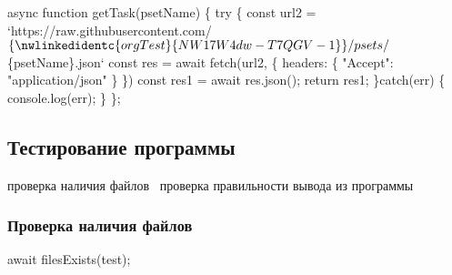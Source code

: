 \nwenddocs{}\endmoddef\nwstartdeflinemarkup{}\nwenddeflinemarkup
async function getTask(psetName)
\{
        try
        \{
        const url2 = `https://raw.githubusercontent.com/$\{\nwlinkedidentc{orgTest}{NW17W4dw-T7QGV-1}\}/psets/$\{psetName\}.json` 
        const res = await fetch(url2, 
        \{ 
                headers: 
                \{ 
                        "Accept": "application/json"
                 \}
        \})
        const res1 = await res.json();
        return res1;
        \}catch(err)
        \{
                console.log(err);
        \}
\};
\nwendcode{}\nwdocspar

\subsection{Тестирование программы}
\nwenddocs{}\endmoddef\nwstartdeflinemarkup{}\nwenddeflinemarkup
        \LA{}проверка наличия файлов~{\nwtagstyle{}}\RA{}
        \LA{}проверка правильности вывода из программы~{\nwtagstyle{}}\RA{}
\nwendcode{}\nwdocspar

\subsubsection{Проверка наличия файлов}
\nwenddocs{}\endmoddef\nwstartdeflinemarkup{}\nwenddeflinemarkup
        await filesExists(test);
\nwendcode{}\nwdocspar

